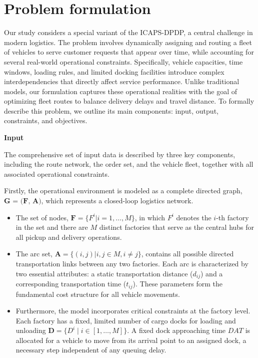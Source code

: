 \documentclass[]{interact}
\begin{document}
\section{Problem formulation}\label{sec:problem} 

Our study considers a special variant of the ICAPS-DPDP, a central challenge in modern logistics. The problem involves dynamically assigning and routing a fleet of vehicles to serve customer requests that appear over time, while accounting for several real-world operational constraints. Specifically, vehicle capacities, time windows, loading rules, and limited docking facilities introduce complex interdependencies that directly affect service performance. Unlike traditional models, our formulation captures these operational realities with the goal of optimizing fleet routes to balance delivery delays and travel distance. To formally describe this problem, we outline its main components: input, output, constraints, and objectives.

\textbf{Input}

The comprehensive set of input data is described by three key components, including the route network, the order set, and the vehicle fleet, together with all associated operational constraints.

Firstly, the operational environment is modeled as a complete directed graph, $\textbf{G = (F, A)}$, which represents a closed-loop logistics network. 
\begin{itemize}
    \item The set of nodes, $\textbf{F} = \{F^i | i = 1, \dots, M\}$, in which $F^i$ denotes the $i$-th factory in the set and there are $M$ distinct factories that serve as the central hubs for all pickup and delivery operations.
    
    \item The arc set, $\textbf{A} = \{(i, j) | i, j \in M, i \neq j\}$, contains all possible directed transportation links between any two factories. Each arc is characterized by two essential attributes: a static transportation distance ($d_{ij}$) and a corresponding transportation time ($t_{ij}$). These parameters form the fundamental cost structure for all vehicle movements.

    \item Furthermore, the model incorporates critical constraints at the factory level. Each factory has a fixed, limited number of cargo docks for loading and unloading $\textbf{D} = \{ D^i \mid i \in [1 , \dots , M]\}$. A fixed dock approaching time $DAT$ is allocated for a vehicle to move from its arrival point to an assigned dock, a necessary step independent of any queuing delay.

\end{itemize}
\end{document}
